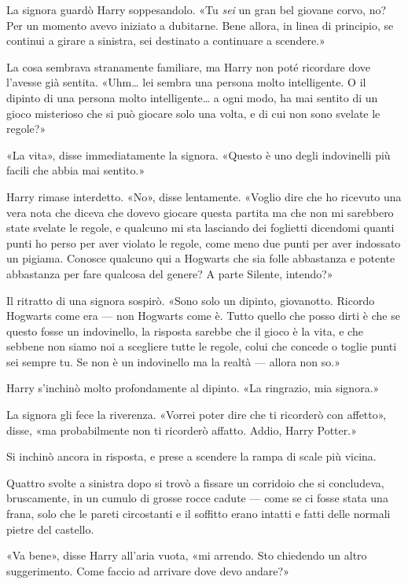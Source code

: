 La signora guardò Harry soppesandolo. «Tu \textit{sei} un gran bel giovane corvo, no? Per un momento avevo iniziato a dubitarne. Bene allora, in linea di principio, se continui a girare a sinistra, sei destinato a continuare a scendere.»

La cosa sembrava stranamente familiare, ma Harry non poté ricordare dove l’avesse già sentita. «Uhm… lei sembra una persona molto intelligente. O il dipinto di una persona molto intelligente… a ogni modo, ha mai sentito di un gioco misterioso che si può giocare solo una volta, e di cui non sono svelate le regole?»

«La vita», disse immediatamente la signora. «Questo è uno degli indovinelli più facili che abbia mai sentito.»

Harry rimase interdetto. «No», disse lentamente. «Voglio dire che ho ricevuto una vera nota che diceva che dovevo giocare questa partita ma che non mi sarebbero state svelate le regole, e qualcuno mi sta lasciando dei foglietti dicendomi quanti punti ho perso per aver violato le regole, come meno due punti per aver indossato un pigiama. Conosce qualcuno qui a Hogwarts che sia folle abbastanza e potente abbastanza per fare qualcosa del genere? A parte Silente, intendo?»

Il ritratto di una signora sospirò. «Sono solo un dipinto, giovanotto. Ricordo Hogwarts come era — non Hogwarts come è. Tutto quello che posso dirti è che se questo fosse un indovinello, la risposta sarebbe che il gioco è la vita, e che sebbene non siamo noi a scegliere tutte le regole, colui che concede o toglie punti sei sempre tu. Se non è un indovinello ma la realtà — allora non so.»

Harry s’inchinò molto profondamente al dipinto. «La ringrazio, mia signora.»

La signora gli fece la riverenza. «Vorrei poter dire che ti ricorderò con affetto», disse, «ma probabilmente non ti ricorderò affatto. Addio, Harry Potter.»

Si inchinò ancora in risposta, e prese a scendere la rampa di scale più vicina.

Quattro svolte a sinistra dopo si trovò a fissare un corridoio che si concludeva, bruscamente, in un cumulo di grosse rocce cadute — come se ci fosse stata una frana, solo che le pareti circostanti e il soffitto erano intatti e fatti delle normali pietre del castello.

«Va bene», disse Harry all’aria vuota, «mi arrendo. Sto chiedendo un altro suggerimento. Come faccio ad arrivare dove devo andare?»

